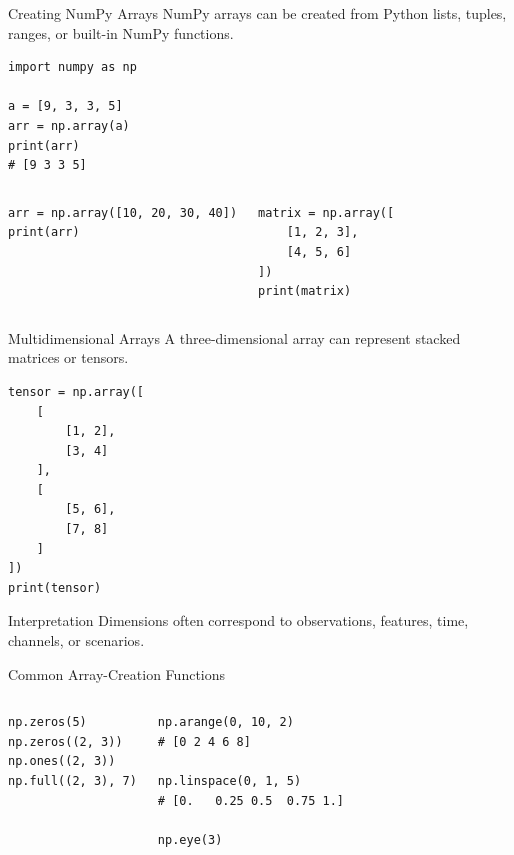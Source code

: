 \documentclass[aspectratio=169,11pt]{beamer}
\begin{document}
\begin{frame}[fragile]{Creating NumPy Arrays}
\small
NumPy arrays can be created from Python lists, tuples, ranges, or built-in NumPy functions.
\begin{lstlisting}[style=py]
import numpy as np

a = [9, 3, 3, 5]
arr = np.array(a)
print(arr)
# [9 3 3 5]
\end{lstlisting}
\vspace{0.2em}
\begin{columns}[T]
\begin{lstlisting}[style=py]
arr = np.array([10, 20, 30, 40])
print(arr)
\end{lstlisting}
\begin{lstlisting}[style=py]
matrix = np.array([
    [1, 2, 3],
    [4, 5, 6]
])
print(matrix)
\end{lstlisting}
\end{columns}
\end{frame}

\begin{frame}[fragile]{Multidimensional Arrays}
\small
A three-dimensional array can represent stacked matrices or tensors.
\begin{lstlisting}[style=py]
tensor = np.array([
    [
        [1, 2],
        [3, 4]
    ],
    [
        [5, 6],
        [7, 8]
    ]
])
print(tensor)
\end{lstlisting}
\begin{block}{Interpretation}
Dimensions often correspond to observations, features, time, channels, or scenarios.
\end{block}
\end{frame}

\begin{frame}[fragile]{Common Array-Creation Functions}
\small
\begin{columns}[T]
\begin{lstlisting}[style=py]
np.zeros(5)
np.zeros((2, 3))
np.ones((2, 3))
np.full((2, 3), 7)
\end{lstlisting}
\begin{lstlisting}[style=py]
np.arange(0, 10, 2)
# [0 2 4 6 8]

np.linspace(0, 1, 5)
# [0.   0.25 0.5  0.75 1.]

np.eye(3)
\end{lstlisting}
\end{columns}
\end{frame}
\end{document}

